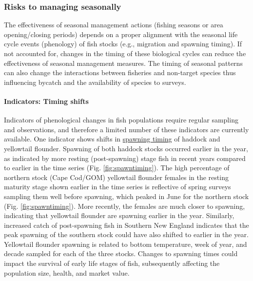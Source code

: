 \documentclass[
  10pt,
]{article}
\begin{document}
\newpage

\subsubsection{Risks to managing seasonally}\label{risks-to-managing-seasonally}

The effectiveness of seasonal management actions (fishing seasons or area opening/closing periods) depends on a proper alignment with the seasonal life cycle events (phenology) of fish stocks (e.g., migration and spawning timing). If not accounted for, changes in the timing of these biological cycles can reduce the effectiveness of seasonal management measures. The timing of seasonal patterns can also change the interactions between fisheries and non-target species thus influencing bycatch and the availability of species to surveys.

\paragraph{Indicators: Timing shifts}\label{indicators-timing-shifts}

Indicators of phenological changes in fish populations require regular sampling and observations, and therefore a limited number of these indicators are currently available. One indicator shows shifts in \href{https://noaa-edab.github.io/catalog/spawn_timing.html}{spawning timing} of haddock and yellowtail flounder. Spawning of both haddock stocks occurred earlier in the year, as indicated by more resting (post-spawning) stage fish in recent years compared to earlier in the time series (Fig. \ref{fig:spawntiming}). The high percentage of northern stock (Cape Cod/GOM) yellowtail flounder females in the resting maturity stage shown earlier in the time series is reflective of spring surveys sampling them well before spawning, which peaked in June for the northern stock (Fig. \ref{fig:spawntiming}). More recently, the females are much closer to spawning, indicating that yellowtail flounder are spawning earlier in the year. Similarly, increased catch of post-spawning fish in Southern New England indicates that the peak spawning of the southern stock could have also shifted to earlier in the year. Yellowtail flounder spawning is related to bottom temperature, week of year, and decade sampled for each of the three stocks. Changes to spawning times could impact the survival of early life stages of fish, subsequently affecting the population size, health, and market value.
\end{document}
